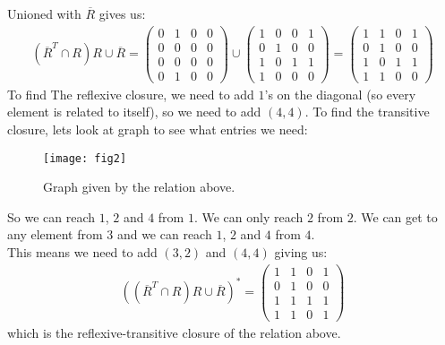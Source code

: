 \documentclass[a4paper, fleqn]{article}
\begin{document}
Unioned with $\overline{R}$ gives us:
\begin{align*}
  \left( \overline{R}^T\cap R\right) R\cup \overline{R} =
 \begin{pmatrix}
    0 & 1 & 0 & 0 \\
    0 & 0 & 0 & 0 \\
    0 & 0 & 0 & 0 \\
    0 & 1 & 0 & 0
  \end{pmatrix} \cup
  \begin{pmatrix}
    1 & 0 & 0 & 1 \\
    0 & 1 & 0 & 0 \\
    1 & 0 & 1 & 1 \\
    1 & 0 & 0 & 0
  \end{pmatrix} =
  \begin{pmatrix}
    1 & 1 & 0 & 1 \\
    0 & 1 & 0 & 0 \\
    1 & 0 & 1 & 1 \\
    1 & 1 & 0 & 0
  \end{pmatrix}
\end{align*}
To find The reflexive closure, we need to add $1$'s on the diagonal (so every
element is related to itself), so we need to add $(4,4)$. To find the transitive closure, lets look at graph to see
what entries we need:
\begin{figure}[H]
  \centering
  \texttt{[image: fig2]}
  \caption{Graph given by the relation above.}
  \label{fig2}
\end{figure}
So we can reach $1$, $2$ and $4$ from $1$. We can only reach $2$ from $2$. We can get to
any element from $3$ and we can reach $1$, $2$ and $4$ from $4$. \\
This means we need to add $(3,2)$ and $(4,4)$ giving us:
\begin{align*}
  \left(\left( \overline{R}^T\cap R\right) R\cup \overline{R}\right)^*  =
  \begin{pmatrix}
    1 & 1 & 0 & 1 \\
    0 & 1 & 0 & 0 \\
    1 & 1 & 1 & 1 \\
    1 & 1 & 0 & 1
  \end{pmatrix}
\end{align*}
which is the reflexive-transitive closure of the relation above.
\end{document}

